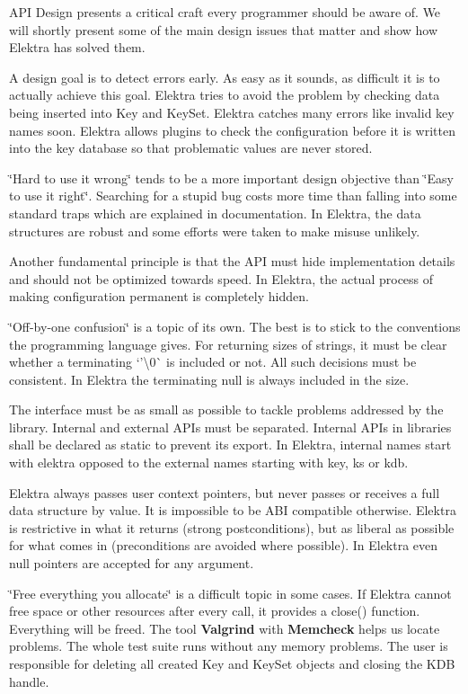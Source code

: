 A\+PI Design presents a critical craft every programmer should be aware of. We will shortly present some of the main design issues that matter and show how Elektra has solved them.

A design goal is to detect errors early. As easy as it sounds, as difficult it is to actually achieve this goal. Elektra tries to avoid the problem by checking data being inserted into {\ttfamily Key} and {\ttfamily Key\+Set}. Elektra catches many errors like invalid key names soon. Elektra allows plugins to check the configuration before it is written into the key database so that problematic values are never stored.

\char`\"{}\+Hard to use it wrong\char`\"{} tends to be a more important design objective than \char`\"{}\+Easy to use it right\char`\"{}. Searching for a stupid bug costs more time than falling into some standard traps which are explained in documentation. In Elektra, the data structures are robust and some efforts were taken to make misuse unlikely.

Another fundamental principle is that the A\+PI must hide implementation details and should not be optimized towards speed. In Elektra, the actual process of making configuration permanent is completely hidden.

\char`\"{}\+Off-\/by-\/one confusion\char`\"{} is a topic of its own. The best is to stick to the conventions the programming language gives. For returning sizes of strings, it must be clear whether a terminating `'\textbackslash{}0\textquotesingle{}\`{} is included or not. All such decisions must be consistent. In Elektra the terminating null is always included in the size.

The interface must be as small as possible to tackle problems addressed by the library. Internal and external A\+P\+Is must be separated. Internal A\+P\+Is in libraries shall be declared as {\ttfamily static} to prevent its export. In Elektra, internal names start with {\ttfamily elektra} opposed to the external names starting with {\ttfamily key}, {\ttfamily ks} or {\ttfamily kdb}.

Elektra always passes user context pointers, but never passes or receives a full data structure by value. It is impossible to be A\+BI compatible otherwise. Elektra is restrictive in what it returns (strong postconditions), but as liberal as possible for what comes in (preconditions are avoided where possible). In Elektra even null pointers are accepted for any argument.

\char`\"{}\+Free everything you allocate\char`\"{} is a difficult topic in some cases. If Elektra cannot free space or other resources after every call, it provides a {\ttfamily close()} function. Everything will be freed. The tool {\bfseries{Valgrind}} with {\bfseries{Memcheck}} helps us locate problems. The whole test suite runs without any memory problems. The user is responsible for deleting all created {\ttfamily Key} and {\ttfamily Key\+Set} objects and closing the {\ttfamily K\+DB} handle.

